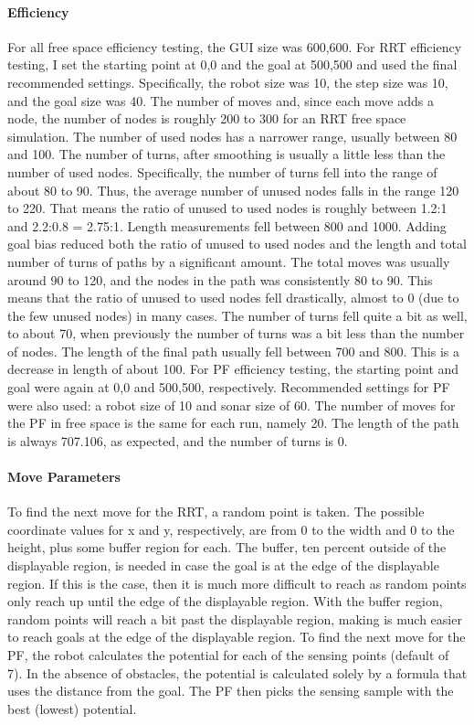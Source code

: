 \documentclass[12pt]{article}
\begin{document}
\paragraph*{Efficiency}
For all free space efficiency testing, the GUI size was 600,600.
For RRT efficiency testing, I set the starting point at 0,0 and the goal at 500,500 and used the final recommended settings. Specifically, the robot size was 10, the step size was 10, and the goal size was 40.
The number of moves and, since each move adds a node, the number of nodes is roughly 200 to 300 for an RRT free space simulation. The number of used nodes has a narrower range, usually between 80 and 100. The number of turns, after smoothing is usually a little less than the number of used nodes. Specifically, the number of turns fell into the range of about 80 to 90. Thus, the average number of unused nodes falls in the range 120 to 220. That means the ratio of unused to used nodes is roughly between 1.2:1 and 2.2:0.8 = 2.75:1. Length measurements fell between 800 and 1000. Adding goal bias reduced both the ratio of unused to used nodes and the length and total number of turns of paths by a significant amount. The total moves was usually around 90 to 120, and the nodes in the path was consistently 80 to 90. This means that the ratio of unused to used nodes fell drastically, almost to 0 (due to the few unused nodes) in many cases. The number of turns fell quite a bit as well, to about 70, when previously the number of turns was a bit less than the number of nodes. The length of the final path usually fell between 700 and 800. This is a decrease in length of about 100. 
For PF efficiency testing, the starting point and goal were again at 0,0 and 500,500, respectively. Recommended settings for PF were also used: a robot size of 10 and sonar size of 60.
The number of moves for the PF in free space is the same for each run, namely 20. The length of the path is always 707.106, as expected, and the number of turns is 0.

\paragraph*{Move Parameters}
To find the next move for the RRT, a random point is taken. The possible coordinate values for x and y, respectively, are from 0 to the width and 0 to the height, plus some buffer region for each. The buffer, ten percent outside of the displayable region, is needed in case the goal is at the edge of the displayable region. If this is the case, then it is much more difficult to reach as random points only reach up until the edge of the displayable region. With the buffer region, random points will reach a bit past the displayable region, making is much easier to reach goals at the edge of the displayable region.
To find the next move for the PF, the robot calculates the potential for each of the sensing points (default of 7). In the absence of obstacles, the potential is calculated solely by a formula that uses the distance from the goal. The PF then picks the sensing sample with the best (lowest) potential.
\end{document}
